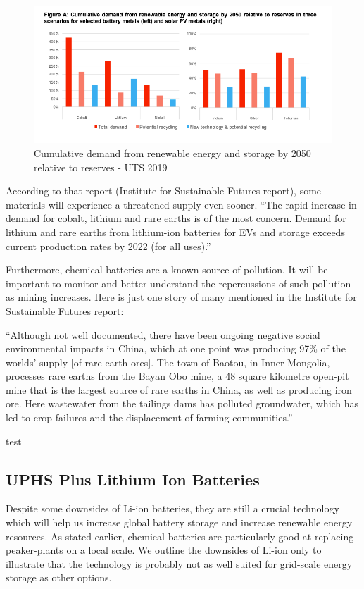 \documentclass[hidelinks,12pt,a4paper]{article}
\begin{document}
\begin{figure}[ht!]
    \centering
    \includegraphics[width=1\textwidth]{chemical-battery-reserves-for-2050.png}
    \caption{Cumulative demand from renewable energy and storage by 2050 relative to reserves -  UTS 2019 \cite{ResponsibleMineralsSourcingForRenewableEnergy}}
\end{figure}
\FloatBarrier

According to that report (Institute for Sustainable Futures report), some materials will experience a threatened supply even sooner. “The rapid increase in demand for cobalt, lithium and rare earths is of the most concern. Demand for lithium and rare earths from lithium-ion batteries for EVs and storage exceeds current production rates by 2022 (for all uses).” \cite{ResponsibleMineralsSourcingForRenewableEnergy}

Furthermore, chemical batteries are a known source of pollution. It will be  important to monitor and better understand the repercussions of such pollution as mining increases. Here is just one story of many mentioned in the Institute for Sustainable Futures report:

\begin{displayquote}
“Although not well documented, there have been ongoing negative social environmental impacts in China, which at one point was producing 97\% of the worlds’ supply [of rare earth ores]. The town of Baotou, in Inner Mongolia, processes rare earths from the Bayan Obo mine, a 48 square kilometre open-pit mine that is the largest source of rare earths in China, as well as producing iron ore. Here wastewater from the tailings dams has polluted groundwater, which has led to crop failures and the displacement of farming communities.”
\end{displayquote}

test
\subsection{UPHS Plus Lithium Ion Batteries}
Despite some downsides of Li-ion batteries, they are still a crucial technology which will help us increase global battery storage and increase renewable energy resources. As stated earlier, chemical batteries are particularly good at replacing peaker-plants on a local scale. We outline the downsides of Li-ion only to illustrate that the technology is probably not as well suited for grid-scale energy storage as other options.
\end{document}
